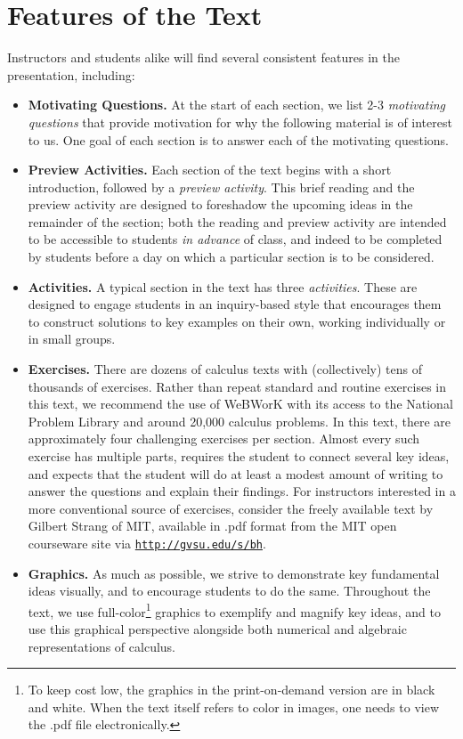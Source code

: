 \section*{Features of the Text}

Instructors and students alike will find several consistent features in the presentation, including:

\begin{itemize}
	\item {\bf Motivating Questions.}  At the start of each section, we list 2-3 \emph{motivating questions} that provide motivation for why the following material is of interest to us.  One goal of each section is to answer each of the motivating questions.
	\item {\bf Preview Activities.} Each section of the text begins with a short introduction, followed by a \emph{preview activity}.  This brief reading and the preview activity are designed to foreshadow the upcoming ideas in the remainder of the section; both the reading and preview activity are intended to be accessible to students \emph{in advance} of class, and indeed to be completed by students before a day on which a particular section is to be considered.
	\item {\bf Activities.}  A typical section in the text has three \emph{activities}.  These are designed to engage students in an inquiry-based style that encourages them to construct solutions to key examples on their own, working individually or in small groups.  
	\item {\bf Exercises.}  There are dozens of calculus texts with (collectively) tens of thousands of exercises.  Rather than repeat standard and routine exercises in this text, we recommend the use of WeBWorK with its access to the National Problem Library and around 20,000 calculus problems.  In this text, there are approximately four challenging exercises per section.  Almost every such exercise has multiple parts, requires the student to connect several key ideas, and expects that the student will do at least a modest amount of writing to answer the questions and explain their findings.  For instructors interested in a more conventional source of exercises, consider the freely available text by Gilbert Strang of MIT, available in .pdf format from the MIT open courseware site via \href{http://gvsu.edu/s/bh}{\texttt{http://gvsu.edu/s/bh}}.
	\item {\bf Graphics.}  As much as possible, we strive to demonstrate key fundamental ideas visually, and to encourage students to do the same.  Throughout the text, we use full-color\footnote{To keep cost low, the graphics in the print-on-demand version are in black and white.  When the text itself refers to color in images, one needs to view the .pdf file electronically.} graphics to exemplify and magnify key ideas, and to use this graphical perspective alongside both numerical and algebraic representations of calculus.

\end{itemize}
